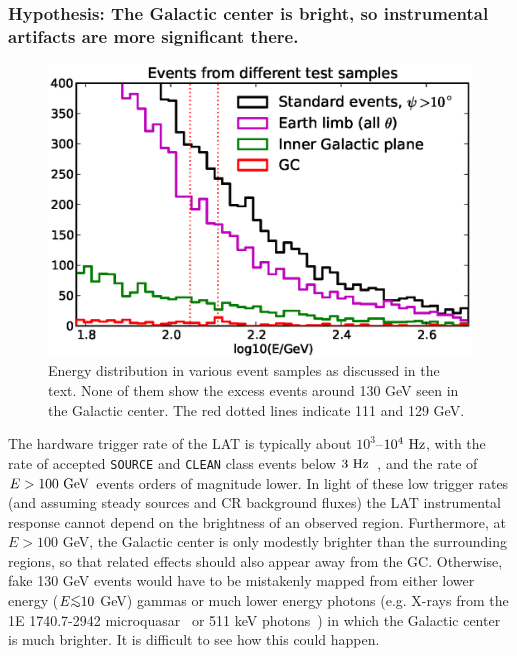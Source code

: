 \documentclass[aps,twocolumn,prd,superscriptaddress,showpacs,nofootinbib,fixfloat]{revtex4}
\newcommand{\Hz}{{\rm ~Hz}}
\newcommand{\GeV}{{\rm ~GeV}}
\def\la{\vcenter{\hbox{$<$}\offinterlineskip\hbox{$\sim$}}}
\begin{document}
\subsubsection{Hypothesis: The Galactic center is bright, so
instrumental artifacts are more significant there.}

\begin{figure}
  \centering
  \includegraphics[width=1.0\linewidth]{plots/target_spectra.eps}
  \caption{Energy distribution in various event samples 
      as
  discussed in the text. None of them show the excess events
  around 130 GeV seen in the Galactic center. The red dotted
  lines indicate 111 and 129 GeV.}
  \label{fig:target_spectra}
\end{figure}

The hardware trigger rate of the LAT is typically
about $10^3$--$10^4\Hz$, with the rate of
accepted \texttt{SOURCE} and \texttt{CLEAN} class events below
$3\Hz$~\citep{collaboration:2012kca}, and the rate of $E>100\GeV$ events
orders of magnitude lower. In light of these low trigger rates
(and assuming steady sources and CR background fluxes) the
LAT instrumental response cannot
depend on the brightness of an observed region.
%
Furthermore, at $E > 100$ GeV, the Galactic center is only modestly brighter
than the surrounding regions, so that related effects should also appear away
from the GC. Otherwise, fake 130 GeV events would have to be mistakenly
mapped from either lower energy ($E \la 10$ GeV) gammas or much lower energy
photons (e.g.  X-rays from the 1E 1740.7-2942 microquasar~\cite{Gallo:2002} or
511 keV photons~\cite{Prantzos:2011}) in which the Galactic center is much
brighter.  It is difficult to see how this could happen.
\end{document}
